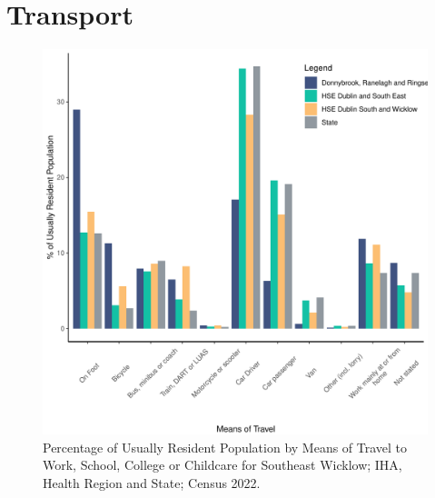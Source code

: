 \documentclass{article}
\begin{document}
\section{Transport}\label{sect:Trans}
\begin{figure}[H]
	\centering
	\includegraphics[width = 120mm]{../figures/TravelED.pdf}
	\caption{Percentage of Usually Resident Population by Means of Travel to Work, School, College or Childcare for Southeast Wicklow; IHA, Health Region and State; Census 2022.}
	\label{fig:vbnv}
	\end{figure}
\end{document}
